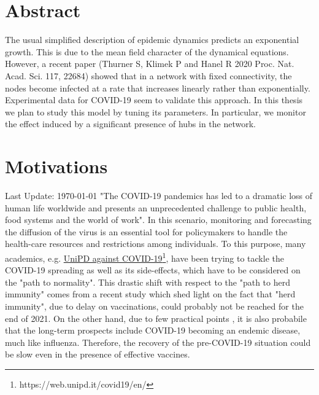 \documentclass[a4paper,12pt,twoside]{book} %
\theoremstyle{definition}
\begin{document}
	


\chapter*{Abstract}
The usual simplified description of epidemic dynamics predicts an exponential growth. This is due to the mean field character of the dynamical equations. However, a recent paper (Thurner S, Klimek P and Hanel R 2020 Proc. Nat. Acad. Sci. 117, 22684) \cite{Thurner::NetBasedExpl} showed
that in a network with fixed connectivity, the nodes become infected at a rate that increases linearly rather than exponentially.
Experimental data for COVID-19 seem to validate this approach. In this thesis we plan to study this model by tuning its parameters.
In particular, we monitor the effect induced by a significant presence of hubs in the network.

\chapter*{Motivations}
Last Update: \today
"The COVID-19 pandemics has led to a dramatic loss of human life worldwide and presents an unprecedented challenge to public health, food systems and the world of work"\cite{Chriscaden::2021_ImpactCOVID19}. In this scenario, monitoring and forecasting the diffusion of the virus is an essential tool for policymakers to handle the health-care resources and restrictions among individuals. To this purpose, many academics, e.g. \href{https://web.unipd.it/covid19/en/}{UniPD against COVID-19}\footnote{https://web.unipd.it/covid19/en/}, have been trying to tackle the COVID-19 spreading as well as its side-effects, which have to be considered on the "path to normality". This drastic shift with respect to the "path to herd immunity" comes from a recent study \cite{GU::2021_SitePathToNormality} which shed light on the fact that "herd immunity", due to delay on vaccinations, could probably not be reached for the end of 2021. On the other hand, due to few practical points \cite{Nature:18.3.2021_NoHerdImmunity}, it is also probabile that the long-term prospects include COVID-19 becoming an endemic disease, much like influenza. 
Therefore, the recovery of the pre-COVID-19 situation could be slow even in the presence of effective vaccines.
\end{document}
